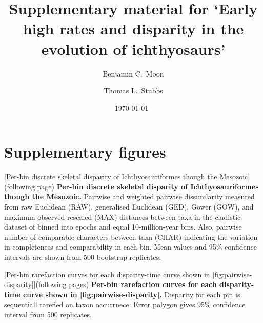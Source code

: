 \documentclass[british,a4paper]{article}
\title{Supplementary material for `Early high rates and disparity in the
evolution of ichthyosaurs'}
\author{Benjamin C.\ Moon \and Thomas L.\ Stubbs}
\date{\today~\version}
\makeatletter
\renewcommand\listoffigures{%
	    \@starttoc{lof}%
    }
\makeatother
\begin{document}
\maketitle

\tableofcontents


\section{Supplementary figures}\label{sec:supplemental-figures}

\listoffigures

\vspace{2em}
\noindent\begin{minipage}[c]{\textwidth}
    [Per-bin discrete skeletal disparity of Ichthyosauriformes though
        the Mesozoic]{(following page) \textbf{Per-bin discrete skeletal disparity
        of Ichthyosauriformes though the Mesozoic.} Pairwise and weighted
        pairwise dissimilarity measured from raw Euclidean (RAW), generalised
        Euclidean (GED), Gower (GOW), and maximum observed rescaled (MAX)
        distances between taxa in the cladistic dataset of \textcite{Moon2018JSP}
        binned into epochs and equal 10-million-year bins. Also, pairwise number
        of comparable characters between taxa (CHAR) indicating the variation in
        completeness and comparability in each bin. Mean values and 95\%
        confidence intervals are shown from 500 bootstrap
        replicates.\label{fig:pairwise-disparity}}
\end{minipage}


\noindent\begin{minipage}[c]{\textwidth}
    [Per-bin rarefaction curves for each disparity-time curve
        shown in \cref{fig:pairwise-disparity}]{(following pages) \textbf{Per-bin
        rarefaction curves for each disparity-time curve shown in
        \cref{fig:pairwise-disparity}.} Disparity for each pin is sequentiall
        rarefied on taxon occurrnece. Error polygon gives 95\% confidence interval
        from 500 replicates.\label{fig:pd-rarefaction-curves}}
\end{minipage}

\end{document}
